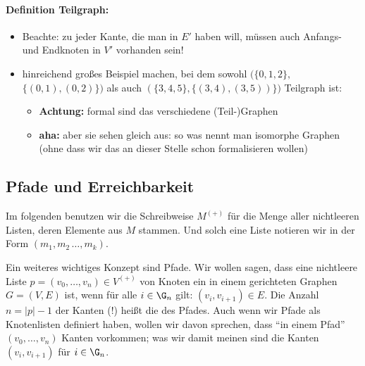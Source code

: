 \begin{tutorium}
  \paragraph{Definition Teilgraph:}
  \begin{itemize}
  \item Beachte: zu jeder Kante, die man in $E'$ haben will, müssen
auch Anfangs- und Endknoten in $V'$ vorhanden sein!
  \item hinreichend großes Beispiel machen, bei dem sowohl
$(\{0,1,2\},$ $\{(0,1),(0,2)\})$ als auch
$(\{3,4,5\},\{(3,4),(3,5))\})$ Teilgraph ist:
    \begin{itemize}
    \item \textbf{Achtung:} formal sind das verschiedene
(Teil-)Graphen
    \item \textbf{aha:} aber sie sehen gleich aus: so was nennt man
isomorphe Graphen (ohne dass wir das an dieser Stelle schon
formalisieren wollen)
    \end{itemize}
  \end{itemize}
\end{tutorium}
\begin{extract*}
  \subsection{Pfade und Erreichbarkeit}
\end{extract*}
\label{subsub:pfade-erreichbarkeit}

Im folgenden benutzen wir die Schreibweise $M^{(+)}$ für die Menge
aller nichtleeren Listen, deren Elemente aus $M$ stammen.
% 
Und solch eine Liste notieren wir in der Form $(m_1,m_2\,\dots, m_k)$.

Ein weiteres wichtiges Konzept sind Pfade.
% 
Wir wollen sagen, dass eine nichtleere Liste $p=(v_0,\dots, v_n)\in
V^{(+)}$ von Knoten ein  in einem
gerichteten Graphen $G=(V,E)$ ist, wenn für alle $i\in \G_n$ gilt:
$(v_i,v_{i+1})\in E$.
% 
Die Anzahl $n=|p| -1$ der Kanten (!) heißt die  des Pfades.
Auch wenn wir Pfade als Knotenlisten definiert haben, wollen wir davon
sprechen, dass "`in einem Pfad"' $(v_0,\dots, v_n)$ Kanten vorkommen;
was wir damit meinen sind die Kanten $(v_i,v_{i+1})$ für $i\in \G_n$.

